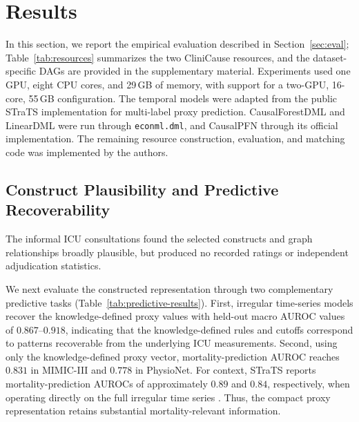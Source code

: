 \documentclass[letterpaper]{article}
\begin{document}

\section{Results}
In this section, we report the empirical evaluation described in
Section~\ref{sec:eval}; Table~\ref{tab:resources} summarizes the two CliniCause
resources, and the dataset-specific DAGs are provided in the supplementary
material. Experiments used one GPU, eight CPU cores, and 29\,GB of memory, with
support for a two-GPU, 16-core, 55\,GB configuration. The temporal models were
adapted from the public STraTS implementation for multi-label proxy prediction.
CausalForestDML and LinearDML were run through \texttt{econml.dml}, and
CausalPFN through its official implementation. The remaining resource
construction, evaluation, and matching code was implemented by the authors.

\subsection{Construct Plausibility and Predictive Recoverability}

The informal ICU consultations found the selected constructs and graph
relationships broadly plausible, but produced no recorded ratings or
independent adjudication statistics.


We next evaluate the constructed representation through two complementary
predictive tasks (Table~\ref{tab:predictive-results}). First, irregular
time-series models recover the knowledge-defined proxy values with held-out macro
AUROC values of \(0.867\)--\(0.918\), indicating that the knowledge-defined
rules and cutoffs correspond to patterns recoverable from the underlying ICU
measurements. Second, using only the knowledge-defined proxy vector,
mortality-prediction AUROC reaches \(0.831\) in MIMIC-III and \(0.778\) in
PhysioNet. For context, STraTS reports mortality-prediction AUROCs of
approximately \(0.89\) and \(0.84\), respectively, when operating directly on
the full irregular time series \cite{tipirneni2022strats}. Thus, the compact
proxy representation retains substantial mortality-relevant information.
\end{document}
